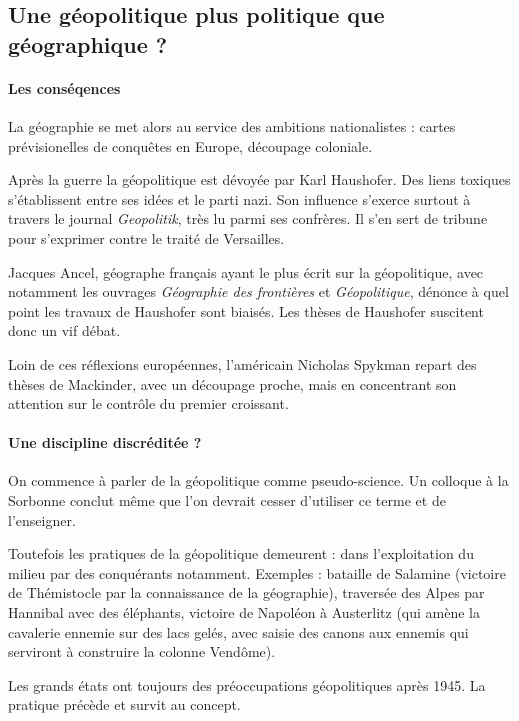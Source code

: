 \documentclass[a4paper,10pt]{article}
\begin{document}
	\subsection{Une géopolitique plus politique que géographique ?}

		\paragraph{Les conséqences}

		La géographie se met alors au service des ambitions nationalistes : cartes prévisionelles de conquêtes en Europe, découpage coloniale.

		Après la guerre la géopolitique est dévoyée par Karl Haushofer.
		Des liens toxiques s'établissent entre ses idées et le parti nazi.
		Son influence s'exerce surtout à travers le journal \emph{Geopolitik}, très lu parmi ses confrères.
		Il s'en sert de tribune pour s'exprimer contre le traité de Versailles.

		Jacques Ancel, géographe français ayant le plus écrit sur la géopolitique, avec notamment les ouvrages \emph{Géographie des frontières} et \emph{Géopolitique}, dénonce à quel point les travaux de Haushofer sont biaisés.
		Les thèses de Haushofer suscitent donc un vif débat.

		Loin de ces réflexions européennes, l'américain Nicholas Spykman repart des thèses de Mackinder, avec un découpage proche, mais en concentrant son attention sur le contrôle du premier croissant.

		\paragraph{Une discipline discréditée ?}

		On commence à parler de la géopolitique comme pseudo-science.
		Un colloque à la Sorbonne conclut même que l'on devrait cesser d'utiliser ce terme et de l'enseigner.

		Toutefois les pratiques de la géopolitique demeurent : dans l'exploitation du milieu par des conquérants notamment.
		Exemples : bataille de Salamine (victoire de Thémistocle par la connaissance de la géographie), traversée des Alpes par Hannibal avec des éléphants, victoire de Napoléon à Austerlitz (qui amène la cavalerie ennemie sur des lacs gelés, avec saisie des canons aux ennemis qui serviront à construire la colonne Vendôme).

		Les grands états ont toujours des préoccupations géopolitiques après 1945.
		La pratique précède et survit au concept.
\end{document}
